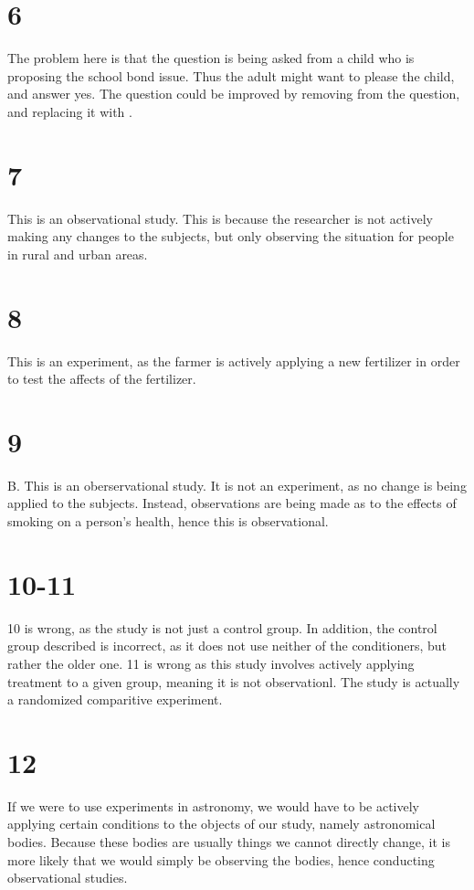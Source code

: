 \documentclass{article}
\theoremstyle{definition}
\newcommand{\?}{\stackrel{?}{=}}
\begin{document}
\section*{6}
The problem here is that the question is being asked from a child who is proposing the school bond issue. Thus the adult might want to please the child, and answer yes. The question could be 
improved by removing  from the question, and replacing it with .

\section*{7}
This is an observational study. This is because the researcher is not actively making any changes to the subjects, but only observing the situation for people in 
rural and urban areas.

\section*{8}
This is an experiment, as the farmer is actively applying a new fertilizer in order to test the affects of the fertilizer.

\section*{9}
B. This is an oberservational study. It is not an experiment, as no change is being applied to the subjects. Instead, observations are being made as to the effects of 
smoking on a person's health, hence this is observational.

\section*{10-11}
10 is wrong, as the study is not just a control group. In addition, the control group described is incorrect, as it does not use neither of the conditioners, but rather the 
older one. 11 is wrong as this study involves actively applying treatment to a given group, meaning it is not observationl. The study is actually a randomized comparitive 
experiment.

\section*{12}
If we were to use experiments in astronomy, we would have to be actively applying certain conditions to the objects of our study, namely astronomical bodies. Because these 
bodies are usually things we cannot directly change, it is more likely that we would simply be observing the bodies, hence conducting observational studies.
\end{document}
